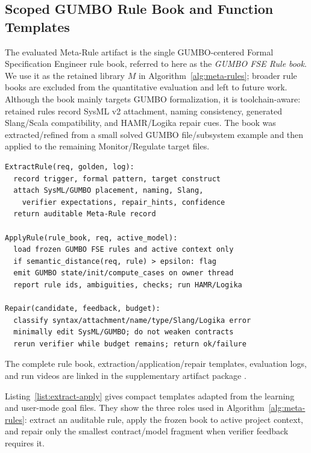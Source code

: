 \documentclass[conference]{IEEEtran}
\begin{document}
\subsection{Scoped GUMBO Rule Book and Function Templates}
\label{sec:gumbo-fse-book}
The evaluated Meta-Rule artifact is the single GUMBO-centered Formal Specification Engineer rule book, referred to here as the \emph{GUMBO FSE Rule book}. We use it as the retained library $M$ in Algorithm~\ref{alg:meta-rules}; broader rule books are excluded from the quantitative evaluation and left to future work. Although the book mainly targets GUMBO formalization, it is toolchain-aware: retained rules record SysML v2 attachment, naming consistency, generated Slang/Scala compatibility, and HAMR/Logika repair cues. The book was extracted/refined from a small solved GUMBO file/subsystem example and then applied to the remaining Monitor/Regulate target files. 
\begin{lstlisting}[caption={Compact ExtractRule, ApplyRule, and Repair templates from the goal files.}, label={list:extract-apply}, basicstyle=\ttfamily\scriptsize]
ExtractRule(req, golden, log):
  record trigger, formal pattern, target construct
  attach SysML/GUMBO placement, naming, Slang,
    verifier expectations, repair_hints, confidence
  return auditable Meta-Rule record

ApplyRule(rule_book, req, active_model):
  load frozen GUMBO FSE rules and active context only
  if semantic_distance(req, rule) > epsilon: flag
  emit GUMBO state/init/compute_cases on owner thread
  report rule ids, ambiguities, checks; run HAMR/Logika

Repair(candidate, feedback, budget):
  classify syntax/attachment/name/type/Slang/Logika error
  minimally edit SysML/GUMBO; do not weaken contracts
  rerun verifier while budget remains; return ok/failure
\end{lstlisting}

The complete rule book, extraction/application/repair templates, evaluation logs, and run videos are linked in the supplementary artifact package \cite{inspecta_repo}.%

Listing~\ref{list:extract-apply} gives compact templates adapted from the learning and user-mode goal files. They show the three roles used in Algorithm~\ref{alg:meta-rules}: extract an auditable rule, apply the frozen book to active project context, and repair only the smallest contract/model fragment when verifier feedback requires it.
\end{document}
